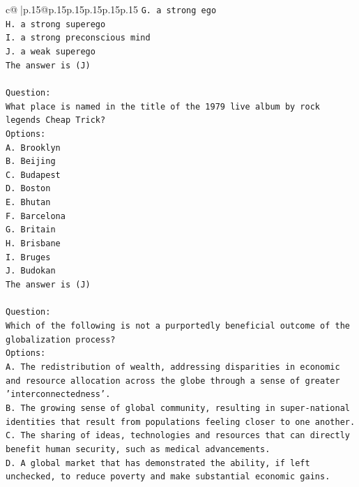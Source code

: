 \documentclass{article}
\begin{document}
{\begin{supertabular}{c@{$\;$}|p{.15\linewidth}@{}p{.15\linewidth}p{.15\linewidth}p{.15\linewidth}p{.15\linewidth}p{.15\linewidth}}
{{{\texttt{G. a strong ego} \\
\texttt{H. a strong superego} \\
\texttt{I. a strong preconscious mind} \\
\texttt{J. a weak superego} \\
\texttt{The answer is (J)} \\
\\ 
\texttt{Question:} \\
\texttt{What place is named in the title of the 1979 live album by rock legends Cheap Trick?} \\
\texttt{Options:} \\
\texttt{A. Brooklyn} \\
\texttt{B. Beijing} \\
\texttt{C. Budapest} \\
\texttt{D. Boston} \\
\texttt{E. Bhutan} \\
\texttt{F. Barcelona} \\
\texttt{G. Britain} \\
\texttt{H. Brisbane} \\
\texttt{I. Bruges} \\
\texttt{J. Budokan} \\
\texttt{The answer is (J)} \\
\\ 
\texttt{Question:} \\
\texttt{Which of the following is not a purportedly beneficial outcome of the globalization process?} \\
\texttt{Options:} \\
\texttt{A. The redistribution of wealth, addressing disparities in economic and resource allocation across the globe through a sense of greater 'interconnectedness'.} \\
\texttt{B. The growing sense of global community, resulting in super{-}national identities that result from populations feeling closer to one another.} \\
\texttt{C. The sharing of ideas, technologies and resources that can directly benefit human security, such as medical advancements.} \\
\texttt{D. A global market that has demonstrated the ability, if left unchecked, to reduce poverty and make substantial economic gains.} \\
            }
        }
    }
     \\ \\


\end{supertabular}}
\end{document}
